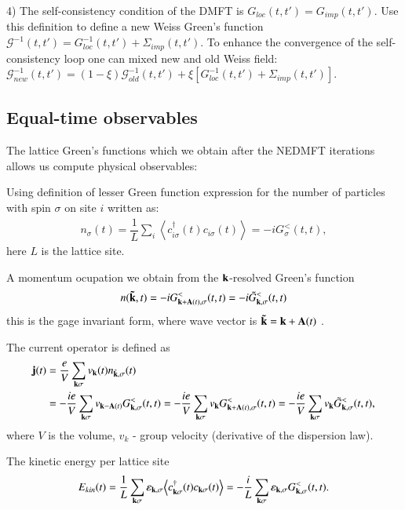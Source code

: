 4) The self-consistency condition of the DMFT is $G_{loc}(t,t')=G_{imp}(t,t')$. Use this definition to define a new Weiss Green's function $\mathcal{G}^{-1}(t,t')=G_{loc}^{-1}(t,t')+\Sigma_{imp}(t,t')$. To enhance the convergence of the self-consistency loop one can mixed new and old Weiss field: $\mathcal{G}_{new}^{-1}(t,t')=(1-\xi)\mathcal{G}_{old}^{-1}(t,t')+\xi \left[G_{loc}^{-1}(t,t') + \Sigma_{imp}(t,t') \right]$.


\FloatBarrier
\subsection{Equal-time observables}
The lattice Green's functions which we obtain after the NEDMFT iterations allows us compute physical observables:

Using definition of lesser Green function expression for the number of particles with spin $\sigma$ on site $i$ written as:
\begin{align}
\label{Number_of_particles}
n_{\sigma}(t)=\dfrac{1}{L}\sum_i {\left\langle c_{i \sigma}^{\dagger}(t) c_{i \sigma}(t)\right\rangle} = -iG_{\sigma}^{<}(t,t),
\end{align}
here $L$ is the lattice site.

A momentum ocupation we obtain from the ${\bf k}$-resolved Green's function
\begin{align}
\label{Number_of_particles_k}
n({\bf \tilde{k}},t)=-iG_{{\bf k}+{\bf A}(t),\sigma}^{<}(t,t)=-i\tilde{G}_{{\bf k},\sigma}^{<}(t,t)
\end{align}
this is the gage invariant form, where wave vector is ${\bf \tilde{k}}={\bf k}+{\bf A}(t)$ \citep{PhysRevB.38.1667}.

The current operator \citep{PhysRevLett.68.2830} is defined as
\begin{align}
\label{Current}
{\bf j}(t)
&
=\dfrac{e}{V}\sum_{{\bf k} \sigma} v_{\bf k}(t)n_{\tilde{\bf k}, \sigma}(t)
\\
&
=-\dfrac{ie}{V}\sum_{{\bf k} \sigma} v_{{\bf k}-{\bf A}(t)} G_{{\bf k},\sigma}^{<}(t,t) =-\dfrac{ie}{V}\sum_{{\bf k} \sigma} v_{\bf k} G_{{\bf k}+{\bf A}(t),\sigma}^{<}(t,t)=-\dfrac{ie}{V}\sum_{{\bf k} \sigma} v_{\bf k} \tilde{G}_{{\bf k},\sigma}^{<}(t,t),
\end{align}
where $V$ is the volume, $v_k$ - group velocity (derivative of the dispersion law).


The kinetic energy per lattice site 
\begin{align}
\label{Kinetic_energy}
E_{kin}(t)=\dfrac{1}{L}\sum_{{\bf k} \sigma} \varepsilon_{{\bf k}, \sigma}{\left\langle c_{{\bf k} \sigma}^{\dagger}(t) c_{{\bf k} \sigma}(t)\right\rangle}
=-\dfrac{i}{L} \sum_{{\bf k} \sigma} \varepsilon_{{\bf k}, \sigma}G_{{\bf k},\sigma}^{<}(t,t).
\end{align}

